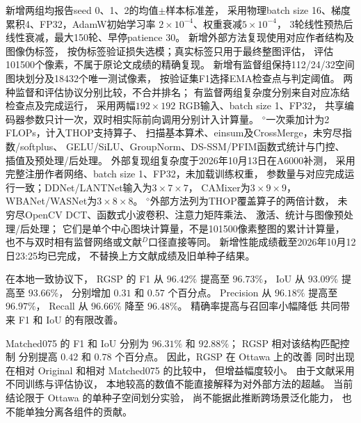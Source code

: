 \begin{table}[!t]
\begin{minipage}{\linewidth}
新增两组均报告seed 0、1、2的均值$\pm$样本标准差，
采用物理batch size 16、梯度累积4、FP32，AdamW初始学习率
$2\times10^{-4}$、权重衰减$5\times10^{-4}$，
3轮线性预热后线性衰减，最大150轮、早停patience 30。
新增外部方法复现使用对应作者结构及图像伪标签，
按伪标签验证损失选模；真实标签只用于最终整图评估，
评估101500个像素，不属于原论文成绩的精确复现。
新增有监督组保持112/24/32空间图块划分及18432个唯一测试像素，
按验证集F1选择EMA检查点与判定阈值。
两种监督和评估协议分别比较，不合并排名；
有监督两组复杂度分别来自对应冻结检查点及完成运行，
采用两幅$192\times192$ RGB输入、batch size 1、FP32，
共享编码器参数只计一次，双时相实际前向调用分别计入计算量。
$^{\diamond}$一次乘加计为2 FLOPs，计入THOP支持算子、
扫描基本算术、einsum及CrossMerge，未穷尽指数/softplus、
GELU/SiLU、GroupNorm、DS-SSM/PFIM函数式统计与门控、
插值及预处理/后处理。
外部复现组复杂度于2026年10月13日在A6000补测，
采用完整注册作者网络、batch size 1、FP32，未加载训练权重，
参数量与对应完成运行一致；DDNet/LANTNet输入为$3\times7\times7$，
CAMixer为$3\times9\times9$，WBANet/WASNet为$3\times8\times8$。
$^{\diamond}$外部方法列为THOP覆盖算子的两倍计数，
未穷尽OpenCV DCT、函数式小波卷积、注意力矩阵乘法、
激活、统计与图像预处理/后处理；
它们是单个中心图块计算量，不是101500像素整图的累计计算量，
也不与双时相有监督网络或文献$^{D}$口径直接等同。
新增性能成绩截至2026年10月12日23:25均已完成，
不替换上方文献成绩及旧单种子结果。
\end{minipage}
\end{table}

在本地一致协议下，
RGSP 的 F1 从 $96.42\%$ 提高至 $96.73\%$，
IoU 从 $93.09\%$ 提高至 $93.66\%$，
分别增加 $0.31$ 和 $0.57$ 个百分点。
Precision 从 $96.18\%$ 提高至 $96.97\%$，
Recall 从 $96.66\%$ 降至 $96.48\%$。
精确率提高与召回率小幅降低
共同带来 F1 和 IoU 的有限改善。

Matched075 的 F1 和 IoU
分别为 $96.31\%$ 和 $92.88\%$；
RGSP 相对该结构匹配控制
分别提高 $0.42$ 和 $0.78$ 个百分点。
因此，RGSP 在 Ottawa 上的改善
同时出现在相对 Original
和相对 Matched075 的比较中，
但增益幅度较小。
由于文献采用不同训练与评估协议，
本地较高的数值不能直接解释为对外部方法的超越。
当前结论限于 Ottawa 的单种子空间划分实验，
尚不能据此推断跨场景泛化能力，
也不能单独分离各组件的贡献。

\FloatBarrier
